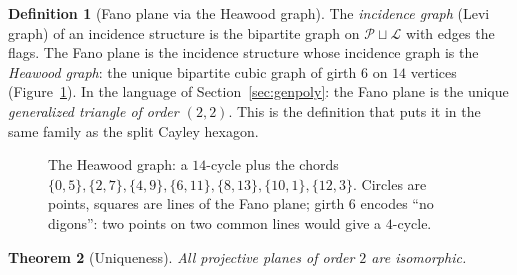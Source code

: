 \documentclass[11pt]{article}
\newtheorem{theorem}{Theorem}[section]
\theoremstyle{definition}
\newtheorem{definition}[theorem]{Definition}
\begin{document}
\begin{definition}[Fano plane via the Heawood graph]\label{def:fano-heawood}
The \emph{incidence graph} (Levi graph) of an incidence structure is the
bipartite graph on $\mathcal P \sqcup \mathcal L$ with edges the flags. The
Fano plane is the incidence structure whose incidence graph is the
\emph{Heawood graph}: the unique bipartite cubic graph of girth $6$ on $14$
vertices (Figure~\ref{fig:heawood}). In the language of
Section~\ref{sec:genpoly}: the Fano plane is the unique \emph{generalized
triangle of order $(2,2)$}. This is the definition that puts it in the same
family as the split Cayley hexagon.
\end{definition}

\begin{figure}[ht]
\centering
{}
\caption{The Heawood graph: a $14$-cycle plus the chords
$\{0,5\},\{2,7\},\{4,9\},\{6,11\},\{8,13\},\{10,1\},\{12,3\}$. Circles are
points, squares are lines of the Fano plane; girth $6$ encodes
``no digons'': two points on two common lines would give a $4$-cycle.}
\label{fig:heawood}
\end{figure}

\begin{theorem}[Uniqueness]\label{thm:fano-unique}
All projective planes of order $2$ are isomorphic.
\end{theorem}
\end{document}
